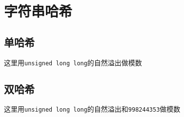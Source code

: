 \section{字符串哈希}
\subsection{单哈希}
这里用\verb|unsigned long long|的自然溢出做模数


\subsection{双哈希}
这里用\verb|unsigned long long|的自然溢出和\verb|998244353|做模数

